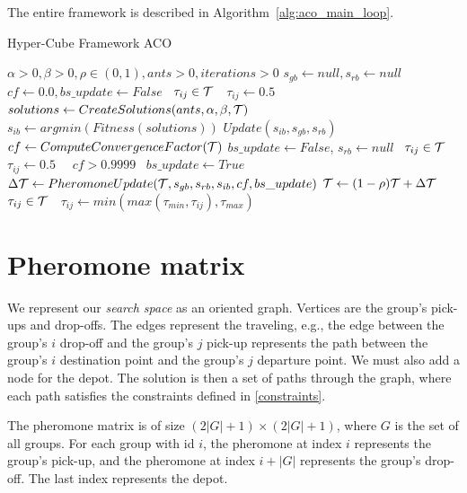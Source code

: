 The entire framework is described in Algorithm~\ref{alg:aco_main_loop}. 

\begin{algorithm}
\caption{Hyper-Cube Framework ACO \cite{HCFMMAS}}
\begin{algorithmic}
\Require $\alpha > 0, \beta > 0, \rho \in (0, 1), ants > 0, iterations > 0$
\State $s_{gb} \gets null, s_{rb} \gets null$  
\State $cf \gets 0.0, bs\_update \gets False$
\State \algorithmicforall\ $\tau_{ij} \in \mathcal{T}$\ \algorithmicdo\ $\tau_{ij} \gets 0.5$\
    \State $solutions \gets CreateSolutions(ants, \alpha, \beta, \mathcal{T})$
    \State $s_{ib} \gets argmin(Fitness(solutions))$
    \State $Update(s_{ib}, s_{gb}, s_{rb})$
    \State $cf \gets ComputeConvergenceFactor(\mathcal{T})$
        \State $bs\_update \gets False$, $s_{rb} \gets null$
        \State \algorithmicforall\ $\tau_{ij} \in \mathcal{T}$\ \algorithmicdo\ $\tau_{ij} \gets 0.5$\
    \Else
        \State \algorithmicif\ $cf > 0.9999$ \algorithmicdo\ $bs\_update \gets True$
        \State $\Delta\mathcal{T} \gets PheromoneUpdate(\mathcal{T}, s_{gb}, s_{rb}, s_{ib}, cf, bs\_update)$
        \State $\mathcal{T} \gets (1-\rho)\mathcal{T} + \Delta\mathcal{T}$  
        \State \algorithmicforall\ $\tau_{ij} \in \mathcal{T}$\ \algorithmicdo\ $\tau_{ij} \gets min(max(\tau_{min}, \tau_{ij}), \tau_{max})$
    \EndIf
\EndFor
\end{algorithmic}
\label{alg:aco_main_loop}
\end{algorithm}

\section{Pheromone matrix}

We represent our \textit{search space} as an oriented graph. Vertices are the group's pick-ups and drop-offs. The edges represent the traveling, e.g., the edge between the group’s $i$ drop-off and the group’s $j$ pick-up represents the path between the group’s $i$ destination point and the group’s $j$ departure point. We must also add a node for the depot. The solution is then a set of paths through the graph, where each path satisfies the constraints defined in \ref{constraints}.

The pheromone matrix is of size $(2|G| + 1) \times (2|G| + 1)$, where $G$ is the set of all groups. For each group with id $i$, the pheromone at index $i$ represents the group's pick-up, and the pheromone at index $i + |G|$ represents the group's drop-off. The last index represents the depot.

